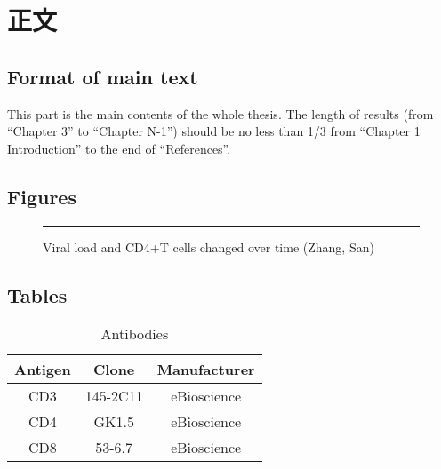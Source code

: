 \documentclass[degree=doctor, language=english, format=medical]{thuthesis}
\begin{document}
\START
\showoutput

\mainmatter

\chapter{正文}

\section{Format of main text}

This part is the main contents of the whole thesis. The length of results (from “Chapter 3” to “Chapter N-1”) should be no less than 1/3 from “Chapter 1 Introduction” to the end of ``References''.


\section{Figures}

\begin{figure}[htb]
  \centering
  \rule{1cm}{1cm}
  \caption{Viral load and CD4+T cells changed over time (Zhang, San)}
\end{figure}


\section{Tables}

\begin{table}[htb]
  \centering
  \caption{Antibodies}
  \begin{tabular}{ccc}
    \toprule
    Antigen & Clone    & Manufacturer \\
    \midrule
    CD3     & 145-2C11 & eBioscience \\
    CD4     & GK1.5    & eBioscience \\
    CD8     & 53-6.7   & eBioscience \\
    \bottomrule
  \end{tabular}
\end{table}


\clearpage
\OMIT
\end{document}
